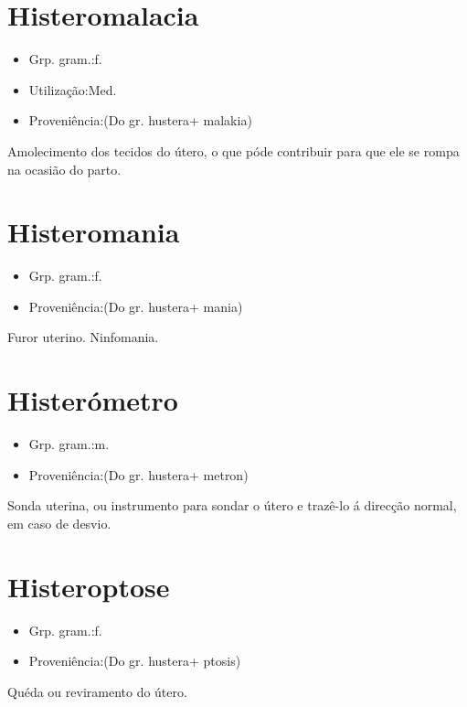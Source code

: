 \documentclass{article}
\begin{document}
\section{Histeromalacia}
\begin{itemize}
\item {Grp. gram.:f.}
\end{itemize}
\begin{itemize}
\item {Utilização:Med.}
\end{itemize}
\begin{itemize}
\item {Proveniência:(Do gr. \textunderscore hustera\textunderscore  + \textunderscore malakia\textunderscore )}
\end{itemize}
Amolecimento dos tecidos do útero, o que póde contribuir para que ele se rompa na ocasião do parto.
\section{Histeromania}
\begin{itemize}
\item {Grp. gram.:f.}
\end{itemize}
\begin{itemize}
\item {Proveniência:(Do gr. \textunderscore hustera\textunderscore  + \textunderscore mania\textunderscore )}
\end{itemize}
Furor uterino.
Ninfomania.
\section{Histerómetro}
\begin{itemize}
\item {Grp. gram.:m.}
\end{itemize}
\begin{itemize}
\item {Proveniência:(Do gr. \textunderscore hustera\textunderscore  + \textunderscore metron\textunderscore )}
\end{itemize}
Sonda uterina, ou instrumento para sondar o útero e trazê-lo á direcção normal, em caso de desvio.
\section{Histeroptose}
\begin{itemize}
\item {Grp. gram.:f.}
\end{itemize}
\begin{itemize}
\item {Proveniência:(Do gr. \textunderscore hustera\textunderscore  + \textunderscore ptosis\textunderscore )}
\end{itemize}
Quéda ou reviramento do útero.
\end{document}
